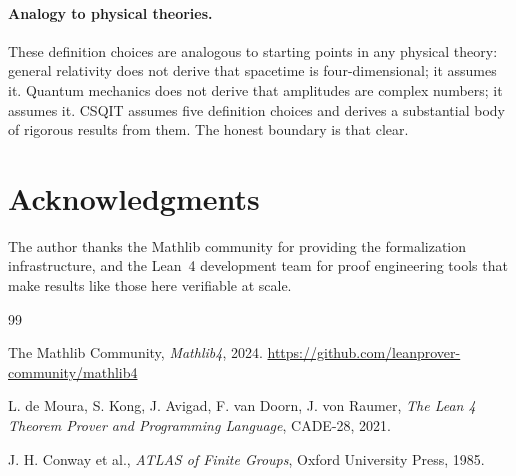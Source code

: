 ﻿\documentclass[11pt]{article}
\begin{document}
\paragraph{Analogy to physical theories.}
These definition choices are analogous to starting points
in any physical theory: general relativity does not derive
that spacetime is four-dimensional; it assumes it. Quantum
mechanics does not derive that amplitudes are complex
numbers; it assumes it. CSQIT assumes five definition
choices and derives a substantial body of rigorous results
from them. The honest boundary is that clear.

\section*{Acknowledgments}
The author thanks the Mathlib community for providing the
formalization infrastructure, and the Lean~4 development
team for proof engineering tools that make results like
those here verifiable at scale.

\begin{thebibliography}{99}

The Mathlib Community,
\emph{Mathlib4}, 2024.
\url{https://github.com/leanprover-community/mathlib4}

L. de Moura, S. Kong, J. Avigad, F. van Doorn,
J. von Raumer,
\emph{The Lean 4 Theorem Prover and Programming Language},
CADE-28, 2021.

J. H. Conway et al.,
\emph{ATLAS of Finite Groups},
Oxford University Press, 1985.

\end{thebibliography}
\end{document}
